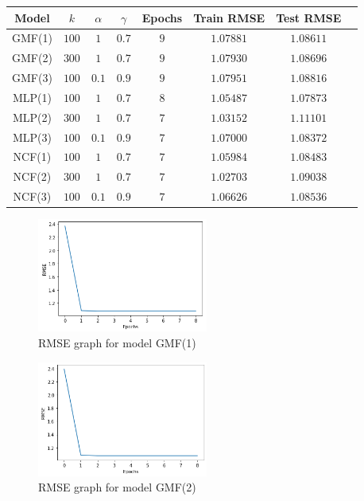 \documentclass[final]{cvpr}
\begin{document}
\begin{tabular}{|c|c|c|c|c|c|c|c|}
	\hline
	Model & $k$ & $\alpha$ & $\gamma$ & Epochs & Train RMSE & Test RMSE
	\\ \hline
	GMF(1) & $100$ & $1$ & $0.7$ & $9$ & $1.07881$ & $1.08611$
	\\ \hline
	GMF(2) & $300$ & $1$ & $0.7$ & $9$ & $1.07930$ & $1.08696$
	\\ \hline
	GMF(3) & $100$ & $0.1$ & $0.9$ & $9$ & $1.07951$ & $1.08816$
	\\ \hline
	MLP(1) & $100$ & $1$ & $0.7$ & $8$ & $1.05487$ & $1.07873$
	\\ \hline
	MLP(2) & $300$ & $1$ & $0.7$ & $7$ & $1.03152$ & $1.11101$
	\\ \hline
	MLP(3) & $100$ & $0.1$ & $0.9$ & $7$ & $1.07000$ & $1.08372$
	\\ \hline
	NCF(1) & $100$ & $1$ & $0.7$ & $7$ & $1.05984$ & $1.08483$
	\\ \hline
	NCF(2) & $300$ & $1$ & $0.7$ & $7$ & $1.02703$ & $1.09038$
	\\ \hline
	NCF(3) & $100$ & $0.1$ & $0.9$ & $7$ & $1.06626$ & $1.08536$
	\\ \hline
\end{tabular}

\begin{figure}
	\includegraphics[width=0.5\textwidth]{screenshot20210415234153.png}
	\caption{RMSE graph for model GMF(1)}
\end{figure}

\begin{figure}
	\includegraphics[width=0.5\textwidth]{screenshot20210415234346.png}
	\caption{RMSE graph for model GMF(2)}
\end{figure}
\end{document}
